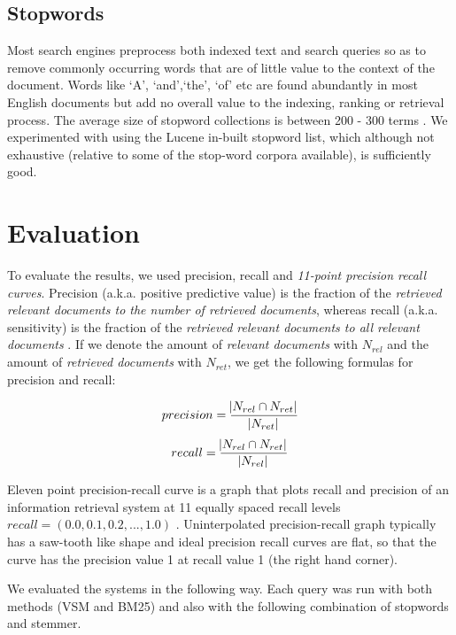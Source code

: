 \subsection{Stopwords}

Most search engines preprocess both indexed text and search queries so as to remove commonly occurring words that are of little value to the context of the document. Words like \lq A', \lq and',\lq the', \lq of' etc are found abundantly in most English documents but add no overall value to the indexing, ranking or retrieval process. The average size of stopword collections is between 200 - 300 terms \citep{manning2008introduction}. We experimented with using the Lucene in-built stopword list, which although not exhaustive (relative to some of the stop-word corpora available), is sufficiently good. 

\section{Evaluation}

To evaluate the results, we used precision, recall and \textit{11-point precision recall curves}. Precision (a.k.a. positive predictive value) is the fraction of the \textit{retrieved relevant documents to the number of retrieved documents}, whereas recall (a.k.a. sensitivity) is the fraction of the \textit{retrieved relevant documents to all relevant documents} \citep{buckland1994relationship}. If we denote the amount of \textit{relevant documents} with $N_{rel}$ and the amount of \textit{retrieved documents} with $ N_{ret} $, we get the following formulas for precision and recall:

\begin{equation}
precision = \frac{ \abs{ N_{rel} \cap N_{ret} } }{\abs{N_{ret}}}
\end{equation}
\begin{equation}
recall = \frac{ \abs{N_{rel} \cap N_{ret} } }{\abs{N_{rel}}}
\end{equation}

Eleven point precision-recall curve is a graph that plots recall and precision of an information retrieval system at 11 equally spaced recall levels $recall = (0.0, 0.1, 0.2,..., 1.0)$ \citep{zhang2009eleven}. Uninterpolated precision-recall graph typically has a saw-tooth like shape and ideal precision recall curves are flat, so that the curve has the precision value 1 at recall value 1 (the right hand corner). 

We evaluated the systems in the following way. Each query was run with both methods (VSM and BM25) and also with the following combination of stopwords and stemmer.

